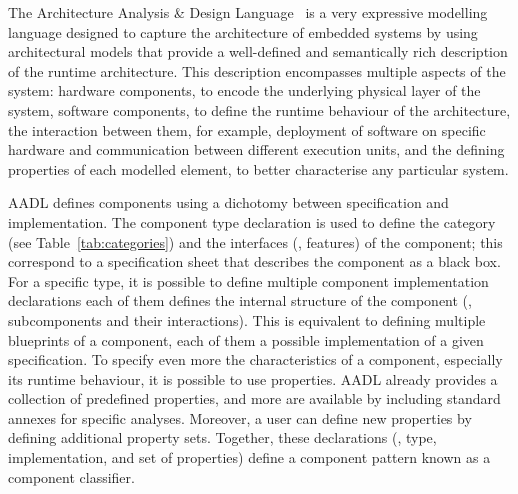 The Architecture Analysis \& Design Language~\cite{feiler2006architecture} is a very expressive modelling language designed to capture the architecture of embedded systems by using architectural models that provide a well-defined and semantically rich description of the runtime architecture. This description encompasses multiple aspects of the system: hardware components, to encode the underlying physical layer of the system, software components, to define the runtime behaviour of the architecture, the interaction between them, for example, deployment of software on specific hardware and communication between different execution units, and the defining properties of each modelled element, to better characterise any particular system.

AADL defines components using a dichotomy between specification and implementation. The component type declaration is used to define the category (see Table~\ref{tab:categories}) and the interfaces (\ie, features) of the component; this correspond to a specification sheet that describes the component as a black box. For a specific type, it is possible to define multiple component implementation declarations each of them defines the internal structure of the component (\ie, subcomponents and their interactions). This is equivalent to defining multiple blueprints of a component, each of them a possible implementation of a given specification. To specify even more the characteristics of a component, especially its runtime behaviour, it is possible to use properties. AADL already provides a collection of predefined properties, and more are available by including standard annexes for specific analyses. Moreover, a user can define new properties by defining additional property sets. Together, these declarations (\ie, type, implementation, and set of properties) define a component pattern known as a component classifier.
 

